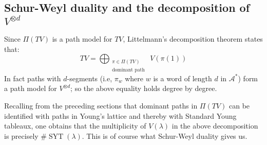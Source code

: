 \documentclass[reqno]{amsart}
\theoremstyle{definition}
\DeclareMathOperator{\SYT}{SYT}
\begin{document}
\subsection{Schur-Weyl duality and the decomposition of $V^{\otimes d}$}
Since $\Pi(TV)$ is a path model for $TV$, Littelmann's decomposition theorem states that:
\[ TV = \bigoplus_{\substack{\pi \in \Pi(TV)\\\text{dominant path }}} V(\pi(1)) \]
In fact paths with $d$-segments (i.e, $\pi_w$ where $w$ is a word of length $d$ in $\mathcal{A}^*$) form a path model for $V^{\otimes d}$; so the above equality holds degree by degree.

Recalling from the preceding sections that dominant paths in $\Pi(TV)$ can be identified with paths in Young's lattice and thereby with Standard Young tableaux, one obtains that the multiplicity of $V(\lambda)$ in the above decomposition is precisely $\#\SYT(\lambda)$. This is of course what Schur-Weyl duality gives us.
\end{document}
